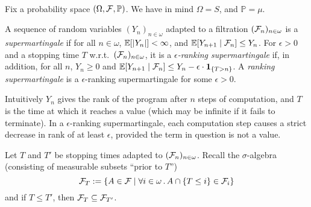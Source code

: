 \paragraph{}

Fix a probability space $(\Omega, \mathcal{F}, \mathbb{P})$. 
We have in mind $\Omega = S$, and $\mathbb{P} = \mu$.

\begin{definition}\rm
A sequence of random variables $(Y_n)_{n \in \omega}$ adapted to a filtration $(\mathcal{F}_n)_{n \in \omega}$ is a \emph{supermartingale} if for all $n \in \omega$, $\mathbb{E}[|Y_n|] < \infty$, and $\mathbb{E}[Y_{n+1} \mid \mathcal{F}_n] \leq Y_n$.
For $\epsilon > 0$ and a stopping time $T$ w.r.t.~$(\mathcal{F}_n)_{n \in \omega}$, it is a \emph{$\epsilon$-ranking supermartingale} if, in addition, for all $n$, $Y_n \geq 0$ and $\mathbb{E}[Y_{n+1} \mid \mathcal{F}_n] \leq Y_n - \epsilon \cdot \mathbf{1}_{\{T > n\}}$.
A \emph{ranking supermartingale} is a $\epsilon$-ranking supermartingale for some $\epsilon > 0$.
\end{definition}

\begin{remark}
\end{remark}

Intuitively $Y_n$ gives the rank of the program after $n$ steps of computation, and $T$ is the time at which it reaches a value (which may be infinite if it fails to terminate).
In a $\epsilon$-ranking supermartingale, each computation step causes a strict decrease in rank of at least $\epsilon$, provided the term in question is not a value.

Let $T$ and $T'$ be stopping times adapted to $(\mathcal{F}_n)_{n \in \omega}$.
Recall the $\sigma$-algebra (consisting of measurable subsets ``prior to $T$'')
\[
\mathcal{F}_T := \{A \in \mathcal{F} \mid \forall i \in \omega \, . \, A \cap \{T \leq i\} \in \mathcal{F}_i\}
\]
and if $T \leq T'$, then $\mathcal{F}_{T} \subseteq \mathcal{F}_{T'}$.


